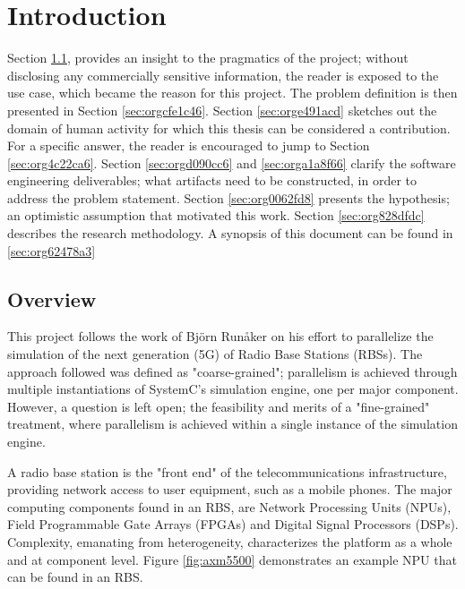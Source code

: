\documentclass[11pt]{article}
\begin{document}
\listoffigures
{}
\clearpage

\section{Introduction}
\label{sec:orgfb7b9f1}
\pagestyle{scrheadings}

Section \ref{sec:org22c0bd3}, provides an insight to the pragmatics of the project; 
without disclosing any commercially sensitive information, the reader is exposed to the use case, which became the reason for this project.
The problem definition is then presented in Section \ref{sec:orgcfe1c46}.
Section \ref{sec:orge491acd} sketches out the domain of human activity for which this thesis can be considered a contribution. For a specific answer, the reader is encouraged to jump to Section \ref{sec:org4c22ca6}.
Section \ref{sec:orgd090cc6} and \ref{sec:orga1a8f66} clarify the software engineering deliverables; what artifacts need to be constructed, in order to address the problem statement.
Section \ref{sec:org0062fd8} presents the hypothesis; an optimistic assumption that motivated this work.
Section \ref{sec:org828dfdc} describes the research methodology.
A synopsis of this document can be found in \ref{sec:org62478a3}

\subsection{Overview}
\label{sec:org22c0bd3}
This project follows the work of Björn Runåker \cite{Runaker2015} on his effort to parallelize the simulation of the next generation (5G) of Radio Base Stations (RBSs).
The approach followed was defined as "coarse-grained";
parallelism is achieved through multiple instantiations of SystemC's simulation engine, one per major component.
However, a question is left open;
the feasibility and merits of a "fine-grained" treatment, where parallelism is achieved within a single instance of the simulation engine.

A radio base station is the "front end" of the telecommunications infrastructure, providing network access to user equipment, such as a mobile phones.
The major computing components found in an RBS, are Network Processing Units (NPUs), Field Programmable Gate Arrays (FPGAs) and Digital Signal Processors (DSPs).
Complexity, emanating from heterogeneity, characterizes the platform as a whole and at component level.
Figure \ref{fig:axm5500} demonstrates an example NPU that can be found in an RBS.
\end{document}

